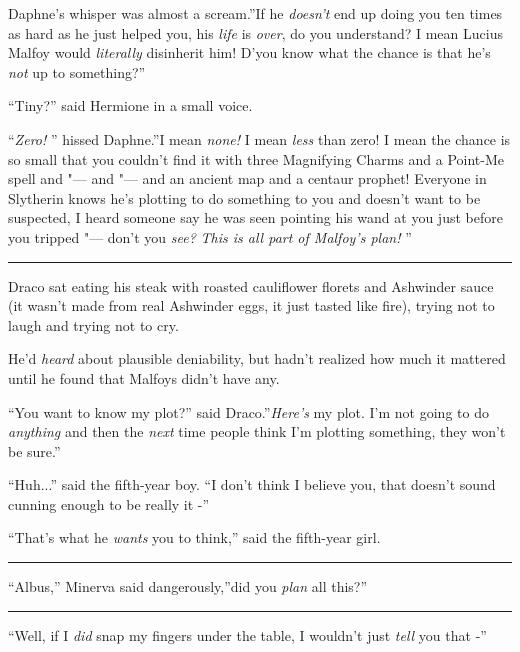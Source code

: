 Daphne's whisper was almost a scream.''If he \emph{doesn't} end up doing
you ten times as hard as he just helped you, his \emph{life} is
\emph{over}, do you understand? I mean Lucius Malfoy would
\emph{literally} disinherit him! D'you know what the chance is that he's
\emph{not} up to something?''

``Tiny?'' said Hermione in a small voice.

``\emph{Zero!} '' hissed Daphne.''I mean \emph{none!} I mean \emph{less}
than zero! I mean the chance is so small that you couldn't find it with
three Magnifying Charms and a Point-Me spell and "--- and "--- and an ancient
map and a centaur prophet! Everyone in Slytherin knows he's plotting to
do something to you and doesn't want to be suspected, I heard someone
say he was seen pointing his wand at you just before you tripped "--- don't
you \emph{see?} \emph{This is all part of Malfoy's plan!} ''

\begin{center}\rule{3in}{0.4pt}\end{center}

Draco sat eating his steak with roasted cauliflower florets and
Ashwinder sauce (it wasn't made from real Ashwinder eggs, it just tasted
like fire), trying not to laugh and trying not to cry.

He'd \emph{heard} about plausible deniability, but hadn't realized how
much it mattered until he found that Malfoys didn't have any.

``You want to know my plot?'' said Draco.''\emph{Here's} my plot. I'm
not going to do \emph{anything} and then the \emph{next} time people
think I'm plotting something, they won't be sure.''

``Huh...'' said the fifth-year boy. ``I don't think I believe you,
that doesn't sound cunning enough to be really it -''

``That's what he \emph{wants} you to think,'' said the fifth-year girl.

\begin{center}\rule{3in}{0.4pt}\end{center}

``Albus,'' Minerva said dangerously,''did you \emph{plan} all this?''

\begin{center}\rule{3in}{0.4pt}\end{center}

``Well, if I \emph{did} snap my fingers under the table, I wouldn't just
\emph{tell} you that -''

